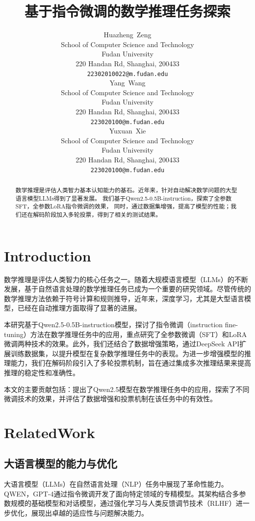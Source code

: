 \documentclass{article}
\title{基于指令微调的数学推理任务探索}
\author{
    Huazheng~Zeng\\
    School of Computer Science and Technology \\
    Fudan University \\
    220 Handan Rd, Shanghai, 200433 \\
    \texttt{22302010022@m.fudan.edu} \\
    \AND
    Yang~Wang\\
    School of Computer Science and Technology \\
    Fudan University \\
    220 Handan Rd, Shanghai, 200433 \\
    \texttt{223020100@m.fudan.edu} \\
    \AND
    Yuxuan~Xie\\
    School of Computer Science and Technology \\
    Fudan University \\
    220 Handan Rd, Shanghai, 200433 \\
    \texttt{223020100@m.fudan.edu} \\
}
\begin{document}
\maketitle


\begin{abstract}
  数学推理是评估人类智力基本认知能力的基石。近年来，针对自动解决数学问题的大型语言模型LLMs得到了显著发展。
  我们基于Qwen2.5-0.5B-instruction，探索了全参数SFT，全参数LoRA指令微调的效果，
  同时，通过数据集增强，提高了模型的性能；我们还在解码阶段加入多轮投票，得到了相关的测试结果。
\end{abstract}



\section{Introduction}

数学推理是评估人类智力的核心任务之一。随着大规模语言模型（LLMs）的不断发展，基于自然语言处理的数学推理任务已成为一个重要的研究领域。尽管传统的数学推理方法依赖于符号计算和规则推导，近年来，深度学习，尤其是大型语言模型，已经在自动推理方面取得了显著的进展。

本研究基于Qwen2.5-0.5B-instruction模型，探讨了指令微调（instruction fine-tuning）方法在数学推理任务中的应用，重点研究了全参数微调（SFT）和LoRA微调两种技术的效果。此外，我们还结合了数据增强策略，通过DeepSeek API扩展训练数据集，以提升模型在复杂数学推理任务中的表现。为进一步增强模型的推理能力，我们在解码阶段引入了多轮投票机制，旨在通过集成多次推理结果来提高推理的稳定性和准确性。

本文的主要贡献包括：提出了Qwen2.5模型在数学推理任务中的应用，探索了不同微调技术的效果，并评估了数据增强和投票机制在该任务中的有效性。







\section{RelatedWork}

\subsection{大语言模型的能力与优化}
大语言模型（LLMs）在自然语言处理（NLP）任务中展现了革命性能力。QWEN\cite{bai2023qwentech}，GPT-4通过指令微调开发了面向特定领域的专精模型。其架构结合多参数规模的基础模型和对话模型，通过强化学习与人类反馈调节技术（RLHF）进一步优化，展现出卓越的适应性与问题解决能力\cite{bai2023qwentech}\cite{openai2024gpt4}。
\end{document}
